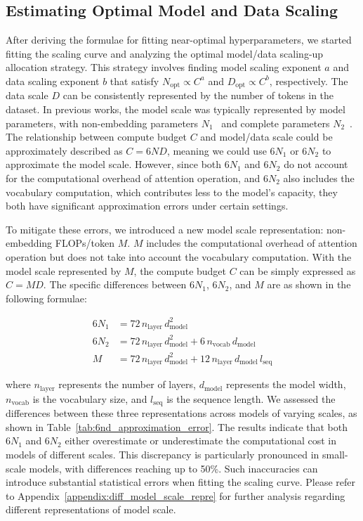 \subsection{Estimating Optimal Model and Data Scaling}

After deriving the formulae for fitting near-optimal hyperparameters, we started fitting the scaling curve and analyzing the optimal model/data scaling-up allocation strategy. This strategy involves finding model scaling exponent $a$ and data scaling exponent $b$ that satisfy $N_{\mathrm{opt}} \propto C^a$ and $D_{\mathrm{opt}} \propto C^b$, respectively. The data scale $D$ can be consistently represented by the number of tokens in the dataset. In previous works, the model scale was typically represented by model parameters, with non-embedding parameters $N_1$~\citep{scalinglaw} and complete parameters $N_2$~\citep{chinchilla}. The relationship between compute budget $C$ and model/data scale could be approximately described as $C=6ND$, meaning we could use $6N_1$ or $6N_2$ to approximate the model scale. However, since both $6N_1$ and $6N_2$ do not account for the computational overhead of attention operation, and $6N_2$ also includes the vocabulary computation, which contributes less to the model's capacity, they both have significant approximation errors under certain settings.

To mitigate these errors, we introduced a new model scale representation: non-embedding FLOPs/token $M$. $M$ includes the computational overhead of attention operation but does not take into account the vocabulary computation. With the model scale represented by $M$, the compute budget $C$ can be simply expressed as $C=MD$. The specific differences between $6N_1$, $6N_2$, and $M$ are as shown in the following formulae:

\begin{equation}
\label{eqa:diff_model_scale}
\begin{aligned}
    6N_1 &= 72\,n_{\mathrm{layer}}\,d_{\mathrm{model}}^2 \\
    6N_2 &= 72\,n_{\mathrm{layer}}\,d_{\mathrm{model}}^2 + 6\,n_{\mathrm{vocab}}\,d_{\mathrm{model}} \\
    M &= 72\,n_{\mathrm{layer}}\,d_{\mathrm{model}}^2 + 12\,n_{\mathrm{layer}}\,d_{\mathrm{model}}\,l_{\mathrm{seq}}
\end{aligned}
\end{equation}

where $n_{\mathrm{layer}}$ represents the number of layers, $d_{\mathrm{model}}$ represents the model width, $n_{\mathrm{vocab}}$ is the vocabulary size, and $l_{\mathrm{seq}}$ is the sequence length. We assessed the differences between these three representations across models of varying scales, as shown in Table~\ref{tab:6nd_approximation_error}. The results indicate that both $6N_1$ and $6N_2$ either overestimate or underestimate the computational cost in models of different scales. This discrepancy is particularly pronounced in small-scale models, with differences reaching up to 50\%. Such inaccuracies can introduce substantial statistical errors when fitting the scaling curve. Please refer to Appendix~\ref{appendix:diff_model_scale_repre} for further analysis regarding different representations of model scale.

